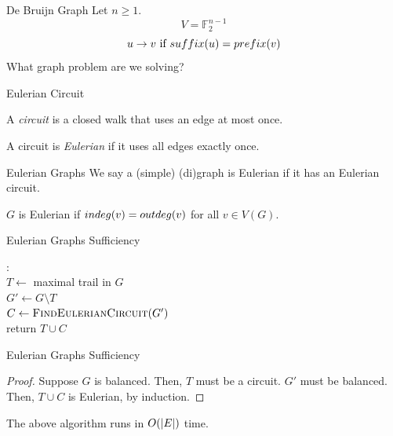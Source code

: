 \documentclass[aspectratio=169, handout]{beamer}
\begin{document}
\begin{frame}{De Bruijn Graph}
	Let $n \ge 1$.
	\pause
	$$
		V = \mathbb{F}_2^{n-1}
	$$
	\pause
	$$
		u \to v \text{ if } \emph{suffix}(u) = \emph{prefix}(v)
	$$
	\pause
	What graph problem are we solving?
\end{frame}

\begin{frame}{Eulerian Circuit}
	\begin{defn}[Circuit]
		A \emph{circuit} is a closed walk that uses an edge at most once.
	\end{defn}
	\pause
	\begin{defn}
		A circuit is \emph{Eulerian} if it uses all edges exactly once.
	\end{defn}
\end{frame}

\begin{frame}{Eulerian Graphs}
	We say a (simple) (di)graph is Eulerian if it has an Eulerian circuit.
	\pause
	\begin{theorem}
		$G$ is Eulerian if $\emph{indeg}(v) = \emph{outdeg}(v)$ for all $v \in V(G)$.
	\end{theorem}
\end{frame}

\begin{frame}{Eulerian Graphs Sufficiency}
	\begin{algo}
		: \+
		\\ $T \gets$ maximal trail in $G$
		\\ $G' \gets G \setminus T$
		\\ $C \gets \textsc{FindEulerianCircuit}(G')$
		\\ return $T \cup C$
	\end{algo}
\end{frame}

\begin{frame}{Eulerian Graphs Sufficiency}
	\begin{proof}
		Suppose $G$ is balanced.
		\pause
		Then, $T$ must be a circuit.
		\pause
		$G'$ must be balanced.
		\pause
		Then, $T \cup C$ is Eulerian, by induction.
	\end{proof}

	\begin{claim}
		The above algorithm runs in $O(\abs{E})$ time.
	\end{claim}
\end{frame}
\end{document}
